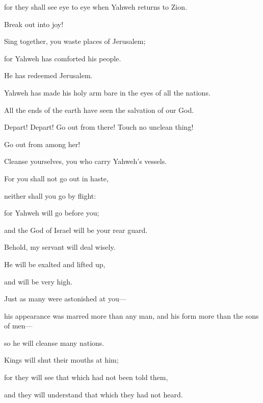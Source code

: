 {\par }{\QB for they shall see eye to eye when Yahweh returns to Zion.
\par }{\Q {}Break out into joy!
\par }{\QB Sing together, you waste places of Jerusalem;
\par }{\QB for Yahweh has comforted his people.
\par }{\QB He has redeemed Jerusalem.
\par }{\Q {}Yahweh has made his holy arm bare in the eyes of all the nations.
\par }{\QB All the ends of the earth have seen the salvation of our God.
\par }{\BB \par }{\Q {}Depart! Depart! Go out from there! Touch no unclean thing!
\par }{\QB Go out from among her!
\par }{\QB Cleanse yourselves, you who carry Yahweh’s vessels.
\par }{\Q {}For you shall not go out in haste,
\par }{\QB neither shall you go by flight:
\par }{\Q for Yahweh will go before you;
\par }{\QB and the God of Israel will be your rear guard.
\par }{\BB \par }{\Q {}Behold, my servant will deal wisely.
\par }{\QB He will be exalted and lifted up,
\par }{\QB and will be very high.
\par }{\Q {}Just as many were astonished at you—
\par }{\QB his appearance was marred more than any man, and his form more than the sons of men—
\par }{\Q {}so he will cleanse many nations.
\par }{\QB Kings will shut their mouths at him;
\par }{\QB for they will see that which had not been told them,
\par }{\QB and they will understand that which they had not heard.

}
